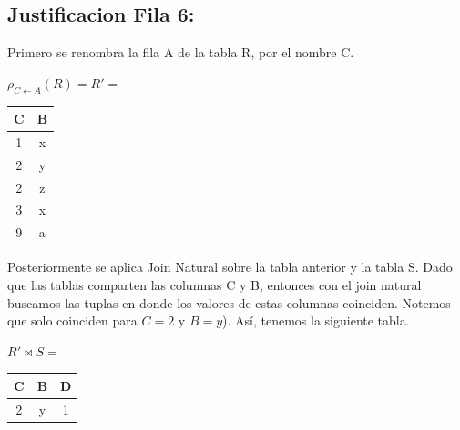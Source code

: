 \subsection*{Justificacion Fila 6:}

Primero se renombra la fila A de la tabla R, por el nombre C.

\begin{center}
$\rho_{C \leftarrow A}(R) = R'=$ \quad
\begin{tabular}{|c|c|}
  \hline
  \textbf{C} & \textbf{B} \\ \hline
  1 & x \\
  2 & y \\
  2 & z \\
  3 & x \\
  9 & a \\ \hline
\end{tabular}
\end{center}

Posteriormente se aplica Join Natural sobre la tabla anterior y la tabla S. Dado que las tablas comparten las columnas C y B, entonces con el join natural buscamos las tuplas en donde los valores de estas columnas coinciden. Notemos que solo coinciden para $C = 2$ y $B = y$). Así, tenemos la siguiente tabla.
\begin{center}
$R' \bowtie S =$ \quad
\begin{tabular}{|c|c|c|}
  \hline
 
  \textbf{C} & \textbf{B} & \textbf{D} \\ \hline
  2 & y & 1 \\ \hline
\end{tabular}
\end{center}
